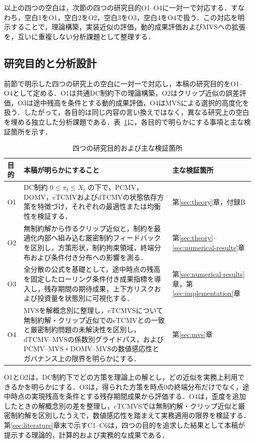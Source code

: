 \documentclass[10pt,a4paper]{article}
\theoremstyle{plain}
\theoremstyle{definition}
\begin{document}
以上の四つの空白は，次節の四つの研究目的O1--O4に一対一で対応する．すなわち，空白1をO1，空白2をO2，空白3をO3，空白4をO4で扱う．この対応を明示することで，理論構築，実装近似の評価，動的成果評価およびMVSへの拡張を，互いに重複しない分析課題として整理する．

\subsection{研究目的と分析設計}

前節で明示した四つの研究上の空白に一対一で対応し，本稿の研究目的をO1--O4として定める．O1は共通DC制約下の理論構築，O2はクリップ近似の誤差評価，O3は途中残高を条件とする動的成果評価，O4はMVSによる選択的高度化を扱う．したがって，各目的は同じ内容の言い換えではなく，異なる研究上の空白を埋める独立した分析課題である．表~\ref{tab:objectives}に，各目的で明らかにする事項と主な検証箇所を示す．

\begin{table}[H]
\centering\small
\caption{四つの研究目的および主な検証箇所}
\label{tab:objectives}
\begin{tabularx}{\textwidth}{p{12mm}p{100mm}X}
\toprule
目的 & 本稿が明らかにすること & 主な検証箇所 \\
\midrule
O1
& DC制約 $0\leq\pi_t\leq X_t$ の下で，PCMV，DOMV，cTCMVおよびdTCMVの状態依存方策を特徴づけ，それぞれの最適性または均衡性を検証する．
& 第\ref{sec:theory}章，付録B \\
O2
& 無制約解から作るクリップ近似と，制約を最適化内部へ組み込む厳密制約フィードバックを区別し，方策形状，制約拘束領域，終端分布および条件付き分布への影響を測る．
& 第\ref{sec:theory}--\ref{sec:numerical-results}章 \\
O3
& 全分散の公式を基礎として，途中時点の残高を固定したローリング条件付き成果指標を導入し，残存期間の期待成果，上下方リスクおよび投資量を状態別に可視化する．
& 第\ref{sec:numerical-results}章，第\ref{sec:implementation}章 \\
O4
& MVSを解概念別に整理し，cTCMVSについて無制約解・クリップ近似でのcTCMVとの一致と厳密制約問題の未解決性を区別し，dTCMV--MVSの係数別グライドパス，およびPCMV--MVS・DOMV--MVSの数値感応性とガバナンス上の限界を明らかにする．
& 第\ref{sec:mvs}章 \\
\bottomrule
\end{tabularx}
\end{table}

O1とO2は，DC制約下でどの方策を理論上の解とし，どの近似を実務上利用できるかを明らかにする．O3は，得られた方策を時点0の終端分布だけでなく，途中時点の実現残高を条件とする残存期間成果から評価する．O4は，歪度を追加したときの解概念別の差を整理し，cTCMVSでは無制約解・クリップ近似と厳密制約解を区別したうえで，数値感応性を踏まえて実務適用の限界を検証する．第\ref{sec:literature}章末で示すC1--C6は，四つの目的を追求した結果として本稿が提示する理論的，計算的および実務的な成果である．
\end{document}
